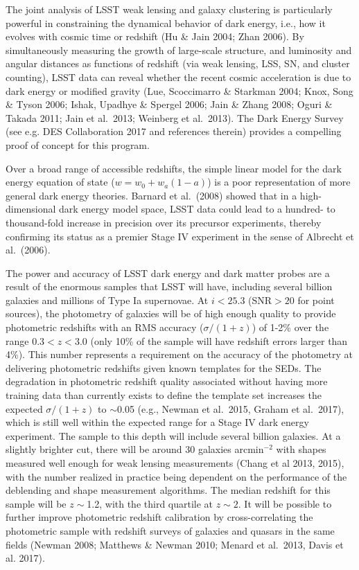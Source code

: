 The joint analysis of LSST weak lensing and galaxy clustering is
particularly powerful in constraining the dynamical behavior of dark
energy, i.e., how it evolves with cosmic time or redshift (Hu \& Jain
2004; Zhan 2006).  By
simultaneously measuring the growth of large-scale structure, and
luminosity and angular distances as functions of redshift (via weak
lensing, LSS, SN, and cluster counting), LSST data can reveal whether
the recent cosmic acceleration is due to dark energy or modified
gravity (Lue, Scoccimarro \& Starkman 2004; Knox, Song \& Tyson 2006;
Ishak, Upadhye \& Spergel 2006; Jain \& Zhang 2008; Oguri \& Takada
2011; Jain et al.~2013; Weinberg et al.~2013). The Dark Energy Survey (see e.g. DES Collaboration 2017 and references therein) provides a compelling proof of concept for this program.

Over a broad range of accessible redshifts, the simple linear model
for the dark energy equation of state ($w = w_0 + w_a(1-a)$) is a poor representation of more
general dark energy theories. Barnard et al.~(2008) showed that in a high-dimensional dark energy model space,
LSST data could lead to a hundred- to thousand-fold increase in precision over its
precursor experiments, thereby confirming its status as
a premier Stage IV experiment in the sense of Albrecht et al.~(2006).

The power and accuracy of LSST dark energy and dark matter probes are
a result of the enormous samples that LSST will have, including
several billion galaxies and millions of Type Ia
supernovae. At $i < 25.3$ (SNR${}>20$ for point sources), the
photometry of galaxies will be of high enough quality to provide
photometric redshifts with an RMS accuracy ($\sigma/(1+z)$) of 1-2\% 
over the range $0.3 < z < 3.0$ (only
10\% of the sample will have redshift errors larger than 4\%). 
This number represents a requirement on the accuracy of the photometry at delivering photometric
redshifts given known templates for the SEDs.  The degradation in photometric redshift quality associated without having more
training data than currently exists to define the template set increases the
expected $\sigma/(1+z)$ to $\sim$0.05 (e.g., Newman et al.~2015, Graham et al.~2017), which is still well within the
expected range for a Stage IV dark energy experiment.  The
sample to this depth will include several billion galaxies.  At a
slightly brighter cut, there will be around 30 galaxies arcmin$^{-2}$
with shapes measured well enough for weak lensing measurements (Chang et
al 2013, 2015), with the number realized in practice being dependent on
the performance of the deblending and shape measurement algorithms.
The median redshift for
this sample will be $z\sim$1.2, with the third quartile at $z\sim2$.
It will be possible to further improve photometric redshift calibration
by cross-correlating the photometric sample with redshift surveys of
galaxies and quasars in the same fields (Newman 2008; Matthews \&
Newman 2010; Menard et al.~2013, Davis et al. 2017).


